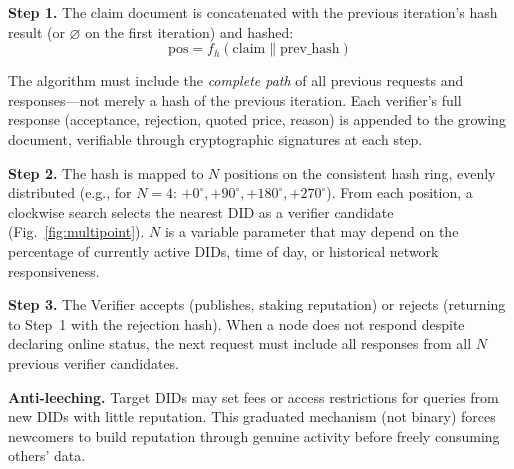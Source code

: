 \documentclass[11pt,a4paper,twocolumn]{article}
\begin{document}
\textbf{Step 1.} The claim document is concatenated with the previous iteration's hash result (or $\varnothing$ on the first iteration) and hashed:
\begin{equation}
\text{pos} = f_h(\text{claim} \| \text{prev\_hash})
\label{eq:hash}
\end{equation}

The algorithm must include the \emph{complete path} of all previous requests and responses---not merely a hash of the previous iteration. Each verifier's full response (acceptance, rejection, quoted price, reason) is appended to the growing document, verifiable through cryptographic signatures at each step.

\textbf{Step 2.} The hash is mapped to $N$ positions on the consistent hash ring, evenly distributed (e.g., for $N=4$: $+0^{\circ}, +90^{\circ}, +180^{\circ}, +270^{\circ}$). From each position, a clockwise search selects the nearest DID as a verifier candidate (Fig.~\ref{fig:multipoint}). $N$ is a variable parameter that may depend on the percentage of currently active DIDs, time of day, or historical network responsiveness.

\textbf{Step 3.} The Verifier accepts (publishes, staking reputation) or rejects (returning to Step~1 with the rejection hash). When a node does not respond despite declaring online status, the next request must include all responses from all $N$ previous verifier candidates.

\textbf{Anti-leeching.} Target DIDs may set fees or access restrictions for queries from new DIDs with little reputation. This graduated mechanism (not binary) forces newcomers to build reputation through genuine activity before freely consuming others' data.
\end{document}

